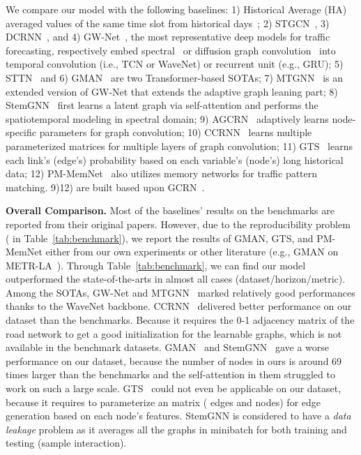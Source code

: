 \documentclass[letterpaper]{article} \usepackage{aaai23}  \usepackage{times}  \usepackage{helvet}  \usepackage{courier}  \usepackage[hyphens]{url}  \usepackage{graphicx} \urlstyle{rm} \def\UrlFont{\rm}  \usepackage{natbib}  \usepackage{caption} \usepackage{multirow}
\begin{document}
We compare our model with the following baselines: 1) Historical Average (HA) averaged values of the same time slot from historical days~\cite{li2018diffusion}; 2) STGCN~\cite{yu2018spatio}, 3) DCRNN~\cite{li2018diffusion}, and 4) GW-Net~\cite{wu2019graph}, the most representative deep models for traffic forecasting, respectively embed spectral~\cite{yu2018spatio} or diffusion graph convolution~\cite{li2018diffusion,wu2019graph} into temporal convolution (i.e., TCN or WaveNet)\cite{yu2018spatio,wu2019graph} or recurrent unit (e.g., GRU)\cite{li2018diffusion}; 5) STTN~\cite{xu2020spatial} and 6) GMAN~\cite{zheng2020gman} are two Transformer-based SOTAs; 7) MTGNN~\cite{wu2020connecting} is an extended version of GW-Net that extends the adaptive graph leaning part;
8) StemGNN~\cite{cao2020spectral} first learns a latent graph via self-attention and performs the spatiotemporal modeling in spectral domain; 9) AGCRN~\cite{bai2020adaptive} adaptively learns node-specific parameters for graph convolution; 10) CCRNN~\cite{ye2021coupled} learns multiple parameterized matrices for multiple layers of graph convolution; 11) GTS~\cite{shang2021discrete} learns each link's (edge's) probability based on each variable's (node's) long historical data; 12) PM-MemNet~\cite{lee2021learning} also utilizes memory networks for traffic pattern matching. 9)12) are built based upon GCRN~\cite{seo2018structured,li2018diffusion}. 



\noindent\textbf{Overall Comparison.} Most of the baselines' results on the benchmarks are reported from their original papers. However, due to the reproducibility problem ( in Table~\ref{tab:benchmark}), we report the results of GMAN, GTS, and PM-MemNet either from our own experiments or other literature (e.g., GMAN on METR-LA~\cite{shao2022pre}). Through Table~\ref{tab:benchmark}, we can find our model outperformed the state-of-the-arts in almost all cases (dataset/horizon/metric). Among the SOTAs, GW-Net\cite{wu2019graph} and MTGNN~\cite{wu2020connecting} marked relatively good performances thanks to the WaveNet backbone. CCRNN~\cite{ye2021coupled} delivered better performance on our dataset than the benchmarks. Because it requires the 0-1 adjacency matrix of the road network to get a good initialization for the learnable graphs, which is not available in the benchmark datasets. GMAN~\cite{zheng2020gman} and StemGNN~\cite{cao2020spectral} gave a worse performance on our dataset, because the number of nodes  in ours is around 69 times larger than the benchmarks and the self-attention in them struggled to work on such a large scale. GTS~\cite{shang2021discrete} could not even be applicable on our dataset, because it requires to parameterize an  matrix ( edges and  nodes) for edge generation based on each node's features. StemGNN is considered to have a \textit{data leakage} problem as it averages all the graphs in minibatch for both training and testing (sample interaction). 
\end{document}
